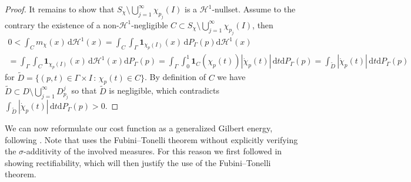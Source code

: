 \documentclass[10pt,a4paper,oneside,final]{article}
\newcommand{\de}{{\mathrm{d}}}
\newcommand{\setchar}[1]{\mathbf{1}_{#1}}
\newcommand{\hdone}{\mathcal{H}^1}
\newcommand{\reSpace}{\Gamma}
\newcommand{\reMeasure}{P_{\reSpace}}
\numberwithin{equation}{section}
\theoremstyle{plain}
\theoremstyle{definition}
\theoremstyle{remark}
\begin{document}
\begin{proof}
It remains to show that $S_\chi\setminus\bigcup_{j=1}^\infty\chi_{p_j}(I)$ is a $\hdone$-nullset.
Assume to the contrary the existence of a non-$\hdone$-negligible $C\subset S_\chi\setminus\bigcup_{j=1}^\infty\chi_{p_j}(I)$, then
\begin{multline*}
0<\int_Cm_\chi(x)\,\de\hdone(x)
=\int_C\int_\reSpace\setchar{\chi_p(I)}(x)\,\de\reMeasure(p)\de\hdone(x)\\
=\int_\reSpace\int_C\setchar{\chi_p(I)}(x)\,\de\hdone(x)\de\reMeasure(p)
=\int_\reSpace\int_0^1\setchar{C}(\chi_p(t))|\dot\chi_p(t)|\,\de t\de\reMeasure(p)
=\int_{\tilde D}|\dot\chi_p(t)|\,\de t\de\reMeasure(p)
\end{multline*}
for $\tilde D=\{(p,t)\in\reSpace\times I\,:\,\chi_p(t)\in C\}$.
By definition of $C$ we have $\tilde D\subset D\setminus\bigcup_{j=1}^\infty D_{p_j}^j$ so that $\tilde D$ is negligible,
which contradicts $\int_{\tilde D}|\dot\chi_p(t)|\,\de t\de\reMeasure(p)>0$.
\end{proof}

We can now reformulate our cost function as a generalized Gilbert energy, following \cite[Prop.\,4.8-4.9]{Bernot-Caselles-Morel-Traffic-Plans}.
Note that \cite[Prop.\,4.8]{Bernot-Caselles-Morel-Traffic-Plans} uses the Fubini--Tonelli theorem without explicitly verifying the $\sigma$-additivity of the involved measures.
For this reason we first followed \cite{Be05} in showing rectifiability, which will then justify the use of the Fubini--Tonelli theorem.
\end{document}
